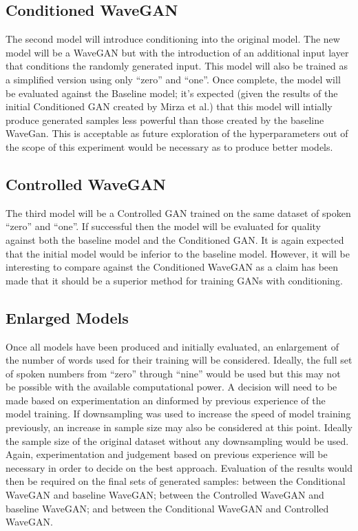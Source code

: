 \documentclass{article}
\begin{document}
\subsection{Conditioned WaveGAN}

The second model will introduce conditioning into the original model.
The new model will be a WaveGAN but with the introduction of an additional input layer that conditions the randomly generated input.
This model will also be trained as a simplified version using only ``zero'' and ``one''.
\newline
\newline
Once complete, the model will be evaluated against the Baseline model; it's expected (given the results of the initial Conditioned GAN created by Mirza et al.) that this model will intially produce generated samples less powerful than those created by the baseline WaveGan.
This is acceptable as future exploration of the hyperparameters out of the scope of this experiment would be necessary as to produce better models.

\subsection{Controlled WaveGAN}

The third model will be a Controlled GAN trained on the same dataset of spoken ``zero'' and ``one''.
If successful then the model will be evaluated for quality against both the baseline model and the Conditioned GAN.
It is again expected that the initial model would be inferior to the baseline model.
However, it will be interesting to compare against the Conditioned WaveGAN as a claim has been made that it should be a superior method for training GANs with conditioning.

\subsection{Enlarged Models}

Once all models have been produced and initially evaluated, an enlargement of the number of words used for their training will be considered.
Ideally, the full set of spoken numbers from ``zero'' through ``nine'' would be used but this may not be possible with the available computational power.
A decision will need to be made based on experimentation an dinformed by previous experience of the model training.
\newline
\newline
If downsampling was used to increase the speed of model training previously, an increase in sample size may also be considered at this point.
Ideally the sample size of the original dataset without any downsampling would be used.
Again, experimentation and judgement based on previous experience will be necessary in order to decide on the best approach.
\newline
\newline
Evaluation of the results would then be required on the final sets of generated samples: between the Conditional WaveGAN and baseline WaveGAN; between the Controlled WaveGAN and baseline WaveGAN; and between the Conditional WaveGAN and Controlled WaveGAN.
\end{document}
